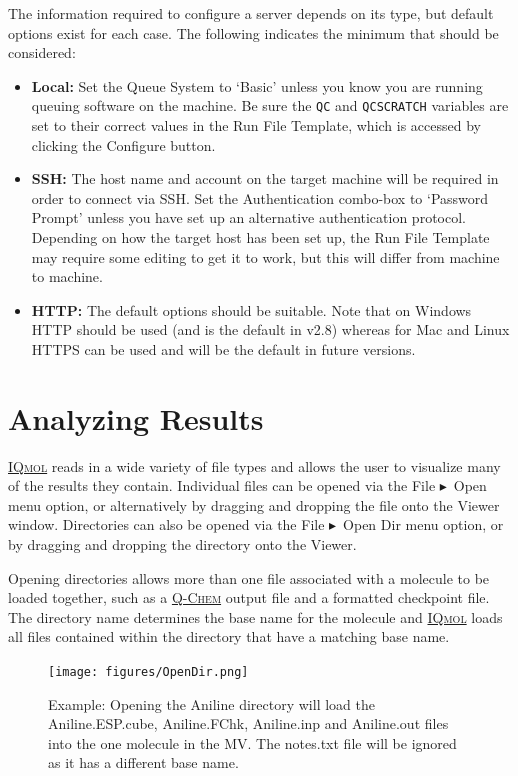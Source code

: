 \documentclass[a4paper,12pt]{article}
\newcommand{\qchem}{\href{http://q-chem.com}{{\scshape Q-Chem}}}
\newcommand{\iqmol}{\href{http://iqmol.org}{{\scshape IQmol}}}
\newcommand{\bt}{\ensuremath{\blacktriangleright}}
\begin{document}
The information required to configure a server depends on its type, but default
options exist for each case.  The following indicates the minimum that should
be considered:

\begin{itemize}
\item {\bf Local:} Set the Queue System to `Basic'
      unless you know you are running queuing software on the machine.
      Be sure the {\tt QC} and {\tt QCSCRATCH} variables are set to their correct
	  values in the Run File Template, which is accessed by clicking the Configure
      button.
\item {\bf SSH:} The host name and account on the target machine will 
      be required in order to connect via SSH.  Set the Authentication combo-box to
      `Password Prompt' unless you have set up an alternative authentication protocol.
	  Depending on how the target host has been set up, the Run File Template
	  may require some editing to get it to work, but this will differ from
      machine to machine.
\item {\bf HTTP:} The default options should be suitable.  Note that on Windows
	  HTTP should be used (and is the default in v2.8) whereas for Mac and
      Linux HTTPS can be used and will be the default in future versions.  
\end{itemize}


\newpage
\section{Analyzing Results}

\iqmol{} reads in a wide variety of file types and allows the user to visualize
many of the results they contain.  Individual files can be opened via the File
\bt\ Open menu option, or alternatively by dragging and dropping the file onto
the Viewer window.  Directories can also be opened via the File \bt\ Open Dir
menu option, or by dragging and dropping the directory onto the Viewer.  

Opening directories allows more than one file associated with a molecule to be
loaded together, such as a \qchem{} output file and a formatted checkpoint
file.  The directory name determines the base name for the molecule and
\iqmol{} loads all files contained within the directory that have a matching
base name.  
\begin{figure}[h]
\begin{center}
\texttt{[image: figures/OpenDir.png]}
\caption{Example: Opening the Aniline directory will load the Aniline.ESP.cube,
Aniline.FChk, Aniline.inp and Aniline.out files into the one molecule in the
MV.  The notes.txt file will be ignored as it has a different base name.} 
\end{center}
\end{figure}
\end{document}
